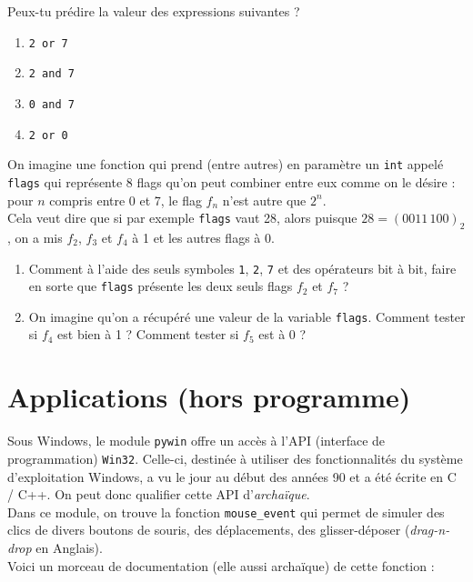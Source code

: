 \documentclass[a4paper,10pt,cours,firamath]{nsi}
\begin{document}
\begin{exercice}
	Peux-tu prédire la valeur des expressions suivantes ?
	\begin{enumerate}
		\item 	\texttt{2 or 7}
		\item 	\texttt{2 and 7}
		\item 	\texttt{0 and 7}
		\item 	\texttt{2 or 0}
	\end{enumerate}
\end{exercice}
\begin{exercice}[]
	On imagine une fonction qui prend (entre autres) en paramètre un \texttt{int} appelé \texttt{flags} qui représente 8 flags qu'on peut combiner entre eux comme on le désire :
	pour $n$ compris entre 0 et 7, le flag $f_n$ n'est autre que $2^n$.\\
	Cela veut dire que si par exemple \texttt{flags} vaut 28, alors puisque $28=(0011\,100)_2$, on a mis $f_2$, $f_3$ et $f_4$ à 1 et les autres flags à 0.
	\begin{enumerate}
		\item 	Comment à l'aide des seuls symboles \texttt{1}, \texttt{2}, \texttt{7} et des opérateurs bit à bit, faire en sorte que \texttt{flags} présente les deux seuls flags $f_2$ et $f_7$ ?
		\item 	On imagine qu'on a récupéré une valeur de la variable \texttt{flags}. Comment tester si $f_4$ est bien à 1 ? Comment tester si $f_5$ est à 0 ?
	\end{enumerate}
\end{exercice}

\section{Applications (hors programme)}

Sous Windows, le module \texttt{pywin} offre un accès à l'API (interface de programmation) \texttt{Win32}. Celle-ci, destinée à utiliser des fonctionnalités du système d'exploitation Windows, a vu le jour au début des années 90 et a été écrite en \textsc{C} / \textsc{C++}. On peut donc qualifier cette API d'\textit{archaïque}.\\
Dans ce module, on trouve la fonction \texttt{mouse_event} qui permet de simuler des clics de divers boutons de souris, des déplacements, des glisser-déposer (\textit{drag-n-drop} en Anglais).\\
Voici un morceau de documentation (elle aussi archaïque) de cette fonction :\\
\end{document}
